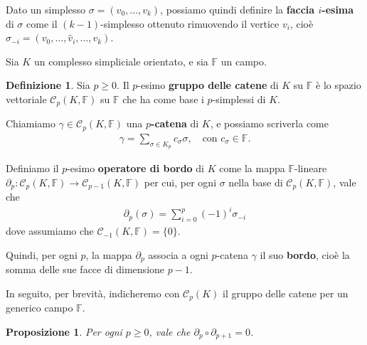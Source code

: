 \documentclass[a4paper, 12pt]{article}
\newtheorem{proposition}[theorem]{Proposizione}
\theoremstyle{definition}
\newtheorem{definition}{Definizione}[section]
\theoremstyle{remark}
\begin{document}
Dato un simplesso $\sigma = (v_0, \ldots, v_k)$, possiamo quindi definire la \textbf{faccia $i$-esima} di $\sigma$ come il \mbox{$(k-1)$-simplesso} ottenuto rimuovendo il vertice $v_i$, cioè $\sigma_{-i} = (v_0, \ldots, \widehat{v}_i, \ldots, v_k)$.

Sia $K$ un complesso simpliciale orientato, e sia $\mathbb{F}$ un campo. 
\begin{definition}
    Sia $p \geq 0$. Il $p$-esimo \textbf{gruppo delle catene} di $K$ su $\mathbb{F}$ è lo spazio vettoriale $\mathcal{C}_p(K, \mathbb{F})$ su $\mathbb{F}$ che ha come base i $p$-simplessi di $K$.

    Chiamiamo $\gamma \in \mathcal{C}_p(K, \mathbb{F})$ una \textbf{$p$-catena} di $K$, e possiamo scriverla come
    \begin{align*}
        \gamma = \sum_{\sigma \in K_p} c_\sigma \sigma ,\quad \text{con } c_\sigma \in \mathbb{F}.
    \end{align*}

    Definiamo il $p$-esimo \textbf{operatore di bordo} di $K$ come la mappa $\mathbb{F}$-lineare $\partial_p : \mathcal{C}_p(K, \mathbb{F}) \to \mathcal{C}_{p-1}(K, \mathbb{F})$ per cui, per ogni $\sigma$ nella base di $\mathcal{C}_p(K, \mathbb{F})$, vale che
    \begin{align*}
        \partial_p(\sigma) = \sum_{i=0}^p {(-1)}^i \sigma_{-i}
    \end{align*}
    dove assumiamo che $\mathcal{C}_{-1}(K, \mathbb{F}) = \{0\}$.

    Quindi, per ogni $p$, la mappa $\partial_p$ associa a ogni $p$-catena $\gamma$ il suo \textbf{bordo}, cioè la somma delle sue facce di dimensione $p-1$.
\end{definition}

In seguito, per brevità, indicheremo con $\mathcal{C}_p(K)$ il gruppo delle catene per un generico campo $\mathbb{F}$.


\begin{proposition}
    Per ogni $p \geq 0$, vale che $\partial_p \circ \partial_{p+1} = 0$.
\end{proposition}
\end{document}
